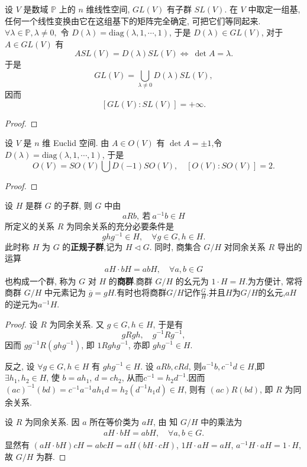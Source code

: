 \documentclass[../../main.tex]{subfiles}%
\begin{document}
\begin{example}
设 \( V \) 是数域 \( \mathbb{P} \) 上的 \( n \) 维线性空间, \( GL(V) \) 有子群 \( SL(V) \). 在 \( V \) 中取定一组基, 任何一个线性变换由它在这组基下的矩阵完全确定, 可把它们等同起来.\( \forall \lambda \in \mathbb{P}, \lambda \neq 0, \) 令 \( D(\lambda) = \text{diag}(\lambda, 1, \cdots, 1) \), 于是 \( D(\lambda) \in GL(V) \), 对于 \( A \in GL(V) \) 有
\[
A SL(V) = D(\lambda) SL(V)\iff \ \det A = \lambda.
\]
于是
\[
GL(V) = \bigcup_{\lambda \neq 0} D(\lambda) SL(V),
\]
因而
\[
[GL(V): SL(V)] = +\infty.
\]
\end{example}
\begin{proof}

\end{proof}

\begin{example}
设 \( V \) 是 \( n \) 维 Euclid 空间. 由 \( A \in O(V) \) 有 \( \det A = \pm 1 \),令 \( D(\lambda) = \text{diag}(\lambda, 1, \cdots, 1) \),  于是
\[
O(V) = SO(V) \bigcup D(-1) SO(V),
\quad
[O(V): SO(V)] = 2.
\]
\end{example}
\begin{proof}

\end{proof}

\begin{theorem}\label{theorem:抽象代数-定理 1.3.4}
设 \( H \) 是群 \( G \) 的子群, 则 \( G \) 中由
\[
a R b, \ \text{若} \ a^{-1}b \in H
\]
所定义的关系 \( R \) 为同余关系的充分必要条件是
\[
g h g^{-1} \in H, \quad \forall g \in G, h \in H.
\]
此时称 \( H \) 为 \( G \) 的\textbf{正规子群},记为 \( H \lhd  G \). 
同时, 商集合 \( G/H \) 对同余关系 \( R \) 导出的运算
\begin{align*}
aH \cdot bH = abH, \quad \forall a, b \in G
\end{align*}
也构成一个群, 称为 \( G \) 对 \( H \) 的\textbf{商群}.商群 \( G/H \) 的幺元为 \( 1 \cdot H = H \).为方便计, 常将商群 \( G/H \) 中元素记为 \( \overline{g} = gH \).有时也将商群$G/H$记作$\frac{G}{H}$.并且$H$为$G/H$的幺元,$aH$的逆元为$a^{-1}H$.
\end{theorem}
\begin{proof}
设 \( R \) 为同余关系. 又 \( g \in G, h \in H \), 于是有
\[
gRgh, \quad g^{-1}Rg^{-1},
\]
因而 \( gg^{-1}R(ghg^{-1}) \), 即 \( 1  R  ghg^{-1} \), 亦即 \( ghg^{-1} \in H \).

反之, 设 \( \forall g \in G, h \in H \) 有 \( ghg^{-1} \in H \). 设 \( a R b, c R d \), 则$a^{-1}b,c^{-1}d\in H$,即 \( \exists h_1, h_2 \in H \), 使 \( b = a h_1 \), \( d = c h_2 \), 从而$c^{-1}=h_2d^{-1}$.因而
\( (ac)^{-1}(bd)=c^{-1}a^{-1}ah_1d=h_2\left( d^{-1}h_1d \right) \in H\), 则有 \( (ac)  R  (bd) \), 即 \( R \) 为同余关系.

设 \( R \) 为同余关系. 因 \( a \) 所在等价类为 \( aH \), 由 知 \( G/H \) 中的乘法为
\begin{align}
aH \cdot bH = abH, \quad \forall a, b \in G. \label{eq:1.3.3}
\end{align}
显然有 \( (aH \cdot bH)cH = abcH = aH(bH \cdot cH) \), \( 1H \cdot aH = aH \), \( a^{-1}H \cdot aH = 1 \cdot H \), 故 \( G/H \) 为群.
\end{proof}
\end{document}
